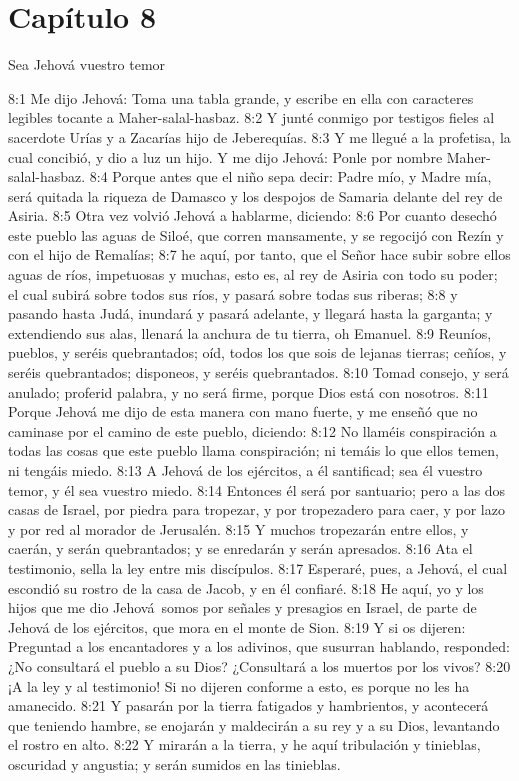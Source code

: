 \section*{Capítulo 8 }
Sea Jehová vuestro temor 
 
8:1 Me dijo Jehová: Toma una tabla grande, y escribe en ella con caracteres legibles tocante a Maher-salal-hasbaz. 
8:2 Y junté conmigo por testigos fieles al sacerdote Urías y a Zacarías hijo de Jeberequías. 
8:3 Y me llegué a la profetisa, la cual concibió, y dio a luz un hijo. Y me dijo Jehová: Ponle por nombre Maher-salal-hasbaz. 
8:4 Porque antes que el niño sepa decir: Padre mío, y Madre mía, será quitada la riqueza de Damasco y los despojos de Samaria delante del rey de Asiria. 
8:5 Otra vez volvió Jehová a hablarme, diciendo: 
8:6 Por cuanto desechó este pueblo las aguas de Siloé, que corren mansamente, y se regocijó con Rezín y con el hijo de Remalías; 
8:7 he aquí, por tanto, que el Señor hace subir sobre ellos aguas de ríos, impetuosas y muchas, esto es, al rey de Asiria con todo su poder; el cual subirá sobre todos sus ríos, y pasará sobre todas sus riberas; 
8:8 y pasando hasta Judá, inundará y pasará adelante, y llegará hasta la garganta; y extendiendo sus alas, llenará la anchura de tu tierra, oh Emanuel. 
8:9 Reuníos, pueblos, y seréis quebrantados; oíd, todos los que sois de lejanas tierras; ceñíos, y seréis quebrantados; disponeos, y seréis quebrantados. 
8:10 Tomad consejo, y será anulado; proferid palabra, y no será firme, porque Dios está con nosotros. 
8:11 Porque Jehová me dijo de esta manera con mano fuerte, y me enseñó que no caminase por el camino de este pueblo, diciendo: 
8:12 No llaméis conspiración a todas las cosas que este pueblo llama conspiración; ni temáis lo que ellos temen, ni tengáis miedo. 
8:13 A Jehová de los ejércitos, a él santificad; sea él vuestro temor, y él sea vuestro miedo. 
8:14 Entonces él será por santuario; pero a las dos casas de Israel, por piedra para tropezar, y por tropezadero para caer, y por lazo y por red al morador de Jerusalén. 
8:15 Y muchos tropezarán entre ellos, y caerán, y serán quebrantados; y se enredarán y serán apresados. 
8:16 Ata el testimonio, sella la ley entre mis discípulos. 
8:17 Esperaré, pues, a Jehová, el cual escondió su rostro de la casa de Jacob, y en él confiaré. 
8:18 He aquí, yo y los hijos que me dio Jehová somos por señales y presagios en Israel, de parte de Jehová de los ejércitos, que mora en el monte de Sion. 
8:19 Y si os dijeren: Preguntad a los encantadores y a los adivinos, que susurran hablando, responded: ¿No consultará el pueblo a su Dios? ¿Consultará a los muertos por los vivos? 
8:20 ¡A la ley y al testimonio! Si no dijeren conforme a esto, es porque no les ha amanecido. 
8:21 Y pasarán por la tierra fatigados y hambrientos, y acontecerá que teniendo hambre, se enojarán y maldecirán a su rey y a su Dios, levantando el rostro en alto. 
8:22 Y mirarán a la tierra, y he aquí tribulación y tinieblas, oscuridad y angustia; y serán sumidos en las tinieblas. 
